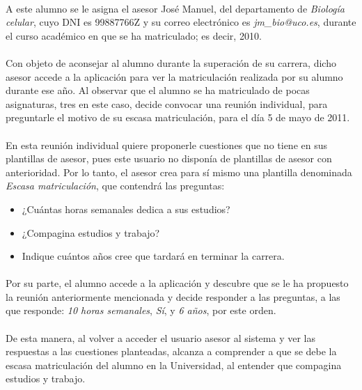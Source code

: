   \paragraph{}A este alumno se le asigna el asesor José Manuel, del departamento
  de \textit{Biología celular}, cuyo DNI es 99887766Z y su correo electrónico
  es \textit{jm\_bio@uco.es}, durante el curso académico en que se ha
  matriculado; es decir, 2010.

  \paragraph{}Con objeto de aconsejar al alumno durante la superación de su
  carrera, dicho asesor accede a la aplicación para ver la matriculación
  realizada por su alumno durante ese año. Al observar que el alumno se ha
  matriculado de pocas asignaturas, tres en este caso, decide convocar una
  reunión individual, para preguntarle el motivo de su escasa matriculación,
  para el día 5 de mayo de 2011.

  \paragraph{}En esta reunión individual quiere proponerle cuestiones que no
  tiene en sus plantillas de asesor, pues este usuario no disponía de plantillas
  de asesor con anterioridad. Por lo tanto, el asesor crea para sí mismo una
  plantilla denominada \textit{Escasa matriculación}, que contendrá las
  preguntas:

  \begin{itemize}
   \item ¿Cuántas horas semanales dedica a sus estudios?
   \item ¿Compagina estudios y trabajo?
   \item Indique cuántos años cree que tardará en terminar la carrera.
  \end{itemize}

  \paragraph{}Por su parte, el alumno accede a la aplicación y descubre que se
  le ha propuesto la reunión anteriormente mencionada y decide responder a las
  preguntas, a las que responde: \textit{10 horas semanales},
  \textit{Sí}, y \textit{6 años}, por este orden.

  \paragraph{}De esta manera, al volver a acceder el usuario asesor al sistema
  y ver las respuestas a las cuestiones planteadas, alcanza a comprender a que
  se debe la escasa matriculación del alumno en la Universidad, al entender que
  compagina estudios y trabajo.

